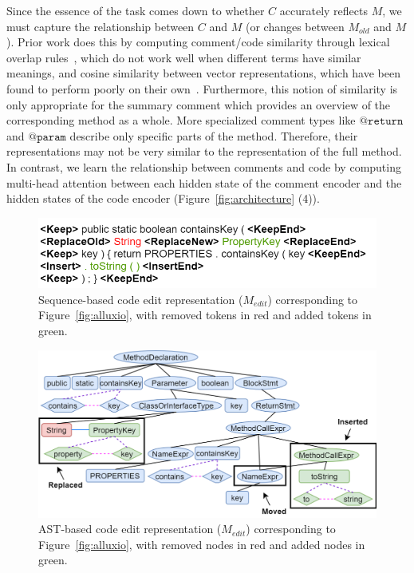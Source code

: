 \documentclass[letterpaper]{article} %
\makeatletter
\newcommand{\CodeIn}[1]{{\ifmmode{\mathtt{#1}}\else$\mathtt{#1}$\fi}}
\newcommand{\Return}{\CodeIn{@return}}
\newcommand{\Param}{\CodeIn{@param}}
\newcommand{\Comment}{$C$}
\newcommand{\OldCode}{$M_{old}$}
\newcommand{\NewCode}{$M$}
\newcommand{\EditCode}{$M_{edit}$}
\makeatother
\begin{document}
Since the essence of the task comes down to whether \Comment{} accurately reflects \NewCode{}, we must capture the relationship between \Comment{} and \NewCode{} (or changes between \OldCode{} and \NewCode{}). Prior work does this by computing comment/code similarity through lexical overlap rules~\cite{ratol2017fragile,SaduThesis}, which do not work well when different terms have similar meanings, and cosine similarity between vector representations, which have been found to perform poorly on their own~\cite{LiuOutdatedLine,Cimasa19}. Furthermore, this notion of similarity is only appropriate for the summary comment which provides an overview of the corresponding method as a whole. More specialized comment types like \Return{} and \Param{} describe only specific parts of the method. Therefore, their representations may not be very similar to the representation of the full method. In contrast, we learn the relationship between comments and code by computing multi-head attention between each hidden state of the comment encoder and the hidden states of the code encoder (Figure~\ref{fig:architecture} (4)).


\begin{figure}
\centering
\includegraphics[width=\columnwidth]{images/diff_sequence.png}
\caption{Sequence-based code edit representation (\EditCode{}) corresponding to Figure~\ref{fig:alluxio}, with removed tokens in red and added tokens in green.}
\label{fig:diff_sequence}
\end{figure}


\begin{figure}
\centering
\includegraphics[width=\columnwidth]{images/diff_ast.png}
\caption{AST-based code edit representation (\EditCode{}) corresponding to Figure~\ref{fig:alluxio}, with removed nodes in red and added nodes in green.}
\label{fig:diff_ast}
\end{figure}
\end{document}

